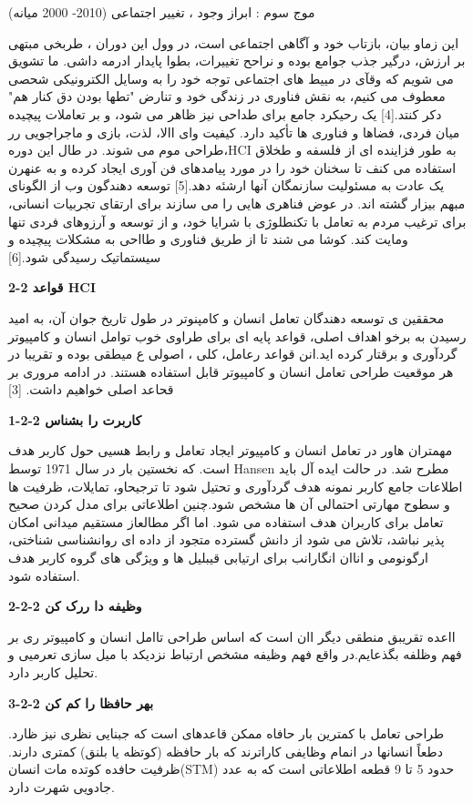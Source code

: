 \documentclass[13pt]{article}
\begin{document}
موج سوم : ابراز وجود ، تغییر اجتماعی (2010- 2000 میانه)

این زماو بیان، بازتاب خود و آگاهی اجتماعی است، در وول این دوران ، طربخی مبتهی بر
ارزش، درگیر جذب جوامع بوده و نراحح تغییرات، بطوا پایدار ادرمه داشی. ما تشویق می
شویم که وقآی در مییط های اجتماعی توجه خود را به وسایل الکترونیکی شحصی معطوف می
کنیم، به نقش فناوری در زندگی خود و تنارض "تطها بودن دق کنار هم" دکر کنتد.[4] یک
رحیکرد جامع برای طداحی نیز ظاهر می شود، و بر تعاملات پیچیده میان فردی، فضاها و
فناوری ها تأکید دارد. کیفیت وای االا، لذت، بازی و ماجراجویی رر طراحی موم می شوند.
در طال این دوره،HCI به طور فزاینده ای از فلسفه و طخلاق استفاده می کنف تا سخنان
خود را در مورد پیامدهای فن آوری ایجاد کرده و  به عنهرن یک عادت به مسئولیت
سازنمگان آنها ارشئه دهد.[5] توسعه دهندگون وب از الگونای مبهم بیزار گشته اند. در
عوض فناهری هایی را می سازند برای ارتقای  تجربیات انسانی، برای ترغیب مردم به تعامل
با تکنطلوژی با شرایا خود، و از توسعه و آرزوهای فردی تنها ومایت کند. کوشا می شند
تا از طریق فناوری و طااحی به مشکلات پیچیده و سیستماتیک رسیدگی شود.[6]

\textbf{{\Large 2-2 قواعد HCI}}

محققین ی توسعه دهندگان تعامل انسان و کامپنوتر در طول تاریخ جوان آن، به امید
رسیدن به برخو اهداف اصلی، قواعد پایه ای برای طراوی خوب توامل انسان و کامپیوتر
گردآوری و برقتار کرده اید.انن قواعد رعامل، کلی ، اصولی ع میطقی بوده و تقریبا در
هر موقعیت طراحی  تعامل انسان و کامپیوتر قابل استفاده هستند. در ادامه مروری بر
قحاعد اصلی خواهیم داشت. [3]

\textbf{{\large 1-2-2 کاربرت را بشناس}}

مهمتران هاور در تعامل انسان و کامپیوتر ایجاد تعامل و رابط هسیی حول کاربر هدف
است. که نخستین بار در سال 1971 توسط Hansen مطرح شد. در حالت ایده آل باید اطلاعات 
جامع کاربر نمونه هدف گردآوری و تحتیل شود تا ترجیحاو، تمایلات، ظرفیت ها و سطوح
مهارتی احتمالی آن ها مشخص شود.چنین اطلاعاتی برای مدل کردن صحیح تعامل برای کاربران
هدف استفاده می شود. اما اگر  مطالعاز مستقیم میدانی امکان پذیر نباشد، تلاش می شود
از دانش گسترده متجود از داده ای روانشناسی شناختی، ارگونومی و اناان انگارانب برای
ارتیابی قیبلیل ها و ویژگی های گروه کاربر هدف استفاده شود.

\textbf{{\large 2-2-2 وظیفه دا ررک کن}}

ااعده تقریبق منطقی دیگر اان است که اساس طراحی تاامل انسان  و کامپیوتر ری بر فهم
وظلفه بگذعایم.در واقع فهم وظیفه مشخص ارتباط نزدیکد با میل سازی تعرمیی و تحلیل
کاربر دارد.

\textbf{{\large 3-2-2  بهر حافظا را کم کن}}

طراحی  تعامل با کمترین بار حافاه ممکن قاعدهای است که جبنایی نظری نیز ظارد. دطعاً
انسانها در انمام وظایفی کاراترند که بار حافظه (کوتظه یا بلنق) کمتری دارند. ظرفیت
حافده کوتده مات انسان(STM) حدود 5 تا 9 قطعه اطلاعاتی است که به عدد جادویی شهرت
دارد.
\end{document}
